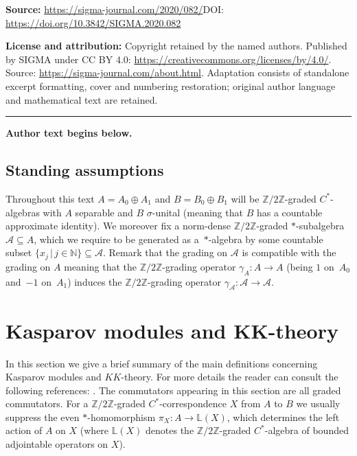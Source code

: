 \documentclass[11pt]{article}
\numberwithin{equation}{section}
\newcommand{\op}{\oplus}
\newcommand{\nn}{\mathbb{N}}
\newcommand{\zz}{\mathbb{Z}}
\newcommand{\ga}{\gamma}
\newcommand{\si}{\sigma}
\newcommand{\s}[1]{\mathscr{#1}}
\newcommand{\B}[1]{\mathbb{#1}}
\newcommand{\su}{\subseteq}
\begin{document}
\noindent\textbf{Source:} \url{https://sigma-journal.com/2020/082/}\quad DOI: \url{https://doi.org/10.3842/SIGMA.2020.082}\par
\noindent\textbf{License and attribution:} Copyright retained by the named authors. Published by SIGMA under CC BY 4.0: \url{https://creativecommons.org/licenses/by/4.0/}. Source: \url{https://sigma-journal.com/about.html}. Adaptation consists of standalone excerpt formatting, cover and numbering restoration; original author language and mathematical text are retained.\par
\medskip\hrule\medskip\noindent\textbf{Author text begins below.}\par
\setcounter{section}{1}
\setcounter{subsection}{0}
\setcounter{subsubsection}{0}
\setcounter{Theorem}{0}
\setcounter{equation}{0}
\subsection{Standing assumptions} Throughout this text $A = A_0 \op A_1$ and $B = B_0 \op B_1$ will be $\zz/2\zz$-graded $C^*$-algebras with $A$ separable and $B$ $\si$-unital (meaning that $B$ has a countable approximate identity). We moreover fix a norm-dense $\zz/2\zz$-graded $*$-subalgebra $\s A \su A$, which we require to be generated as a~$*$-algebra by some countable subset $\{ x_j \,|\, j \in \nn \} \su \s A$. Remark that the grading on $\s A$ is compatible with the grading on $A$ meaning that the $\zz/2\zz$-grading operator $\ga_A \colon A \to A$ (being $1$ on~$A_0$ and~$-1$ on~$A_1$) induces the $\zz/2\zz$-grading operator $\ga_{\s A} \colon \s A \to \s A$.

\section[Kasparov modules and $KK$-theory]{Kasparov modules and $\boldsymbol{KK}$-theory}\label{s:boukas}
In this section we give a brief summary of the main definitions concerning Kasparov modules and $KK$-theory. For more details the reader can consult the following references: \cite{Bla:KOA,JeTh:EKT, Kas:OFE}. The commutators appearing in this section are all graded commutators. For a $\zz/2\zz$-graded $C^*$-correspondence $X$ from $A$ to $B$ we usually suppress the even $*$-homomorphism $\pi_X\colon A \to \B L(X)$, which determines the left action of $A$ on $X$ (where $\B L(X)$ denotes the $\zz/2\zz$-graded $C^*$-algebra of bounded adjointable operators on $X$).
\end{document}
